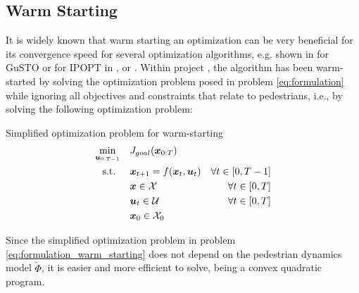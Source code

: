 \subsection{Warm Starting}
\label{text:approach/runtime/warm_starting}
It is widely known that warm starting an optimization can be very beneficial for its convergence speed for several optimization algorithms, e.g. shown in \cite{Banerjee2020} for \ac{GuSTO} or for \ac{IPOPT} in \cite{Shahzad2010}, \cite{John2008} or \cite{Spielberge2019}.
\newline
Within project \project, the algorithm has been warm-started by solving the optimization problem posed in problem \ref{eq:formulation} while ignoring all objectives and constraints that relate to pedestrians, i.e., by solving the following optimization problem: \\

\begin{problem}{Simplified optimization problem for warm-starting}
\begin{align}
\min_{\boldsymbol{u}_{0:T-1}} \quad & J_{goal}(\boldsymbol{x}_{0:T}) \\
\textrm{s.t. } \quad & \boldsymbol{x}_{t+1} = f(\boldsymbol{x}_t, \boldsymbol{u}_t) & \forall t \in [0, T - 1] \\
& \boldsymbol{x} \in \mathcal{X} & \forall t \in [0, T]\\
& \boldsymbol{u}_t \in \mathcal{U} & \forall t \in [0, T]\\
& \boldsymbol{x}_0 \in \mathcal{X}_0
\end{align}
\label{eq:formulation_warm_starting}
\end{problem}

Since the simplified optimization problem in problem \ref{eq:formulation_warm_starting} does not depend on the pedestrian dynamics model $\tilde{\Phi}$, it is easier and more efficient to solve, being a convex quadratic program. \\

\begin{figure}[!ht]
\begin{center}
\end{center}
\label{img:robot_goal_encoding}
\end{figure}

